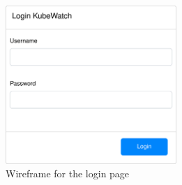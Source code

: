 \begin{figure}[h]
  \centering
  \caption{\label{fig:wireframe-login}Wireframe for the login page}
  \includegraphics[height=6cm]{resources/wireframe_kubewatch-Login.png}
\end{figure}
